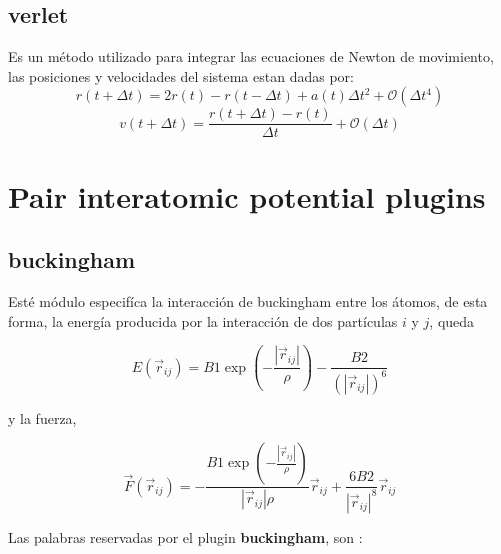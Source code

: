 \subsection{verlet}
Es un m\'etodo utilizado para integrar las ecuaciones de Newton de movimiento,
las posiciones y velocidades del sistema estan dadas por:
$$r(t+\Delta t) = 2r(t) - r(t-\Delta t) + a(t)\Delta t^2 + \mathcal{O}(\Delta t^4)$$
$$v(t+\Delta t) = \frac{r(t+\Delta t) - r(t)}{\Delta t} + \mathcal{O}(\Delta t)$$



\section{Pair interatomic potential plugins}
\subsection{buckingham}

Est\'e m\'odulo especif\'ica la interacci\'on de buckingham entre los \'atomos,
de esta forma, la energ\'ia producida por la interacci\'on de dos part\'iculas
$i$ y $j$, queda

$$E(\vec{r}_{ij}) = B1 \exp\left(-\frac{|\vec{r}_{ij}|}{\rho}\right) -
\frac{B2}{(|\vec{r}_{ij}|)^6}$$

y la fuerza,

$$\vec{F}(\vec{r}_{ij}) =
-\frac{B1\exp\left(-\frac{|\vec{r}_{ij}|}{\rho}\right)}{|\vec{r}_{ij}|\rho}\vec{
r}_{ij} + \frac{6B2}{|\vec{r}_{ij}|^8}\vec{r}_{ij}$$

Las palabras reservadas por el plugin \textbf{buckingham}, son :


